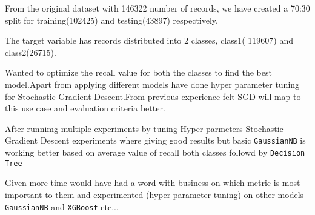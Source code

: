 \documentclass[11pt]{article}
\begin{document}
    From the original dataset with 146322 number of records, we have created
a 70:30 split for training(102425) and testing(43897) respectively.

The target variable has records distributed into 2 classes, class1(
119607) and class2(26715).

Wanted to optimize the recall value for both the classes to find the
best model.Apart from applying different models have done hyper
parameter tuning for Stochastic Gradient Descent.From previous
experience felt SGD will map to this use case and evaluation criteria
better.

After runnimg multiple experiments by tuning Hyper parmeters Stochastic
Gradient Descent experiments where giving good results but basic
\texttt{GaussianNB} is working better based on average value of recall
both classes followd by \texttt{Decision Tree}

Given more time would have had a word with business on which metric is
most important to them and experimented (hyper parameter tuning) on
other models \texttt{GaussianNB} and \texttt{XGBoost} etc...


    
    
    
    
\end{document}
